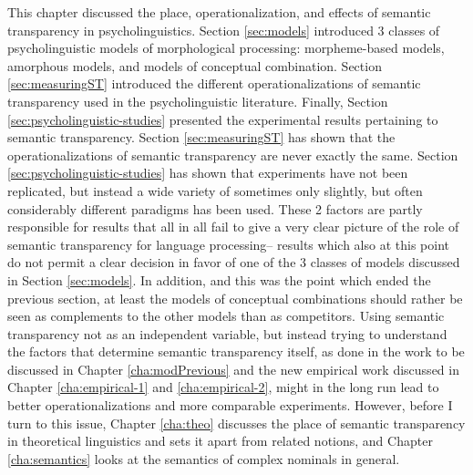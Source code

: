 This chapter discussed the place, operationalization, and effects of
semantic transparency in psycholinguistics. Section \ref{sec:models} introduced
3 classes of psycholinguistic models of morphological processing:
morpheme-based models, amorphous models, and models of conceptual combination. Section
\ref{sec:measuringST} introduced the different operationalizations of semantic
transparency used in the psycholinguistic literature. Finally, Section
\ref{sec:psycholinguistic-studies} presented the experimental results pertaining to semantic
transparency. Section \ref{sec:measuringST} has shown that
the operationalizations of semantic transparency are never exactly the
same. Section \ref{sec:psycholinguistic-studies} has shown that experiments have not been
replicated, but instead a wide variety of sometimes only slightly, but
often considerably different paradigms has been used. These 2 factors
are partly responsible for results that all in all fail to give a very
clear picture of the role of semantic transparency for language
processing-- results which also at this point do not permit a clear
decision in favor of one of the 3 classes of models discussed in Section
\ref{sec:models}. In addition, and this was the point which ended the previous
section, at least the models of conceptual combinations should rather
be seen as complements to the other models than as
competitors. Using semantic transparency not as an independent
variable, but instead trying to understand the factors that determine
semantic transparency itself, as done in the work
to be discussed in Chapter \ref{cha:modPrevious} and the new empirical work discussed
in Chapter \ref{cha:empirical-1} and \ref{cha:empirical-2}, might in the long run lead to better
operationalizations and more comparable experiments. However, before I
turn to this issue, Chapter \ref{cha:theo} discusses the place of semantic
transparency in theoretical linguistics and sets it apart from related notions, and Chapter \ref{cha:semantics} looks at
the semantics of complex nominals in general.  
 


